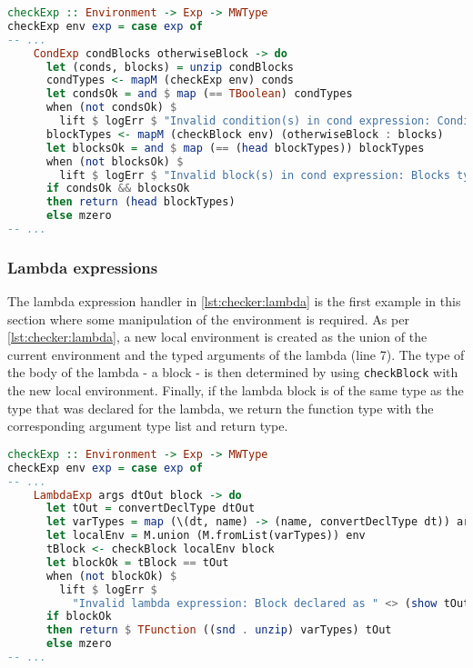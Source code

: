 \begin{lstlisting}[language=haskell,
caption={Handler for \lstinline{cond} expressions},
label=lst:checker:cond]
checkExp :: Environment -> Exp -> MWType
checkExp env exp = case exp of
-- ...
    CondExp condBlocks otherwiseBlock -> do
      let (conds, blocks) = unzip condBlocks
      condTypes <- mapM (checkExp env) conds
      let condsOk = and $ map (== TBoolean) condTypes
      when (not condsOk) $
        lift $ logErr $ "Invalid condition(s) in cond expression: Condition types were " <> (show condTypes)
      blockTypes <- mapM (checkBlock env) (otherwiseBlock : blocks)
      let blocksOk = and $ map (== (head blockTypes)) blockTypes
      when (not blocksOk) $
        lift $ logErr $ "Invalid block(s) in cond expression: Blocks types were " <> (show condTypes)
      if condsOk && blocksOk
      then return (head blockTypes)
      else mzero
-- ...
\end{lstlisting}

\subsubsection{Lambda expressions}
The lambda expression handler in \cref{lst:checker:lambda} is the first example in this section where some manipulation of the environment is required. As per \cref{lst:checker:lambda}, a new local environment is created as the union of the current environment and the typed arguments of the lambda (line 7). The type of the body of the lambda - a block - is then determined by using \lstinline{checkBlock} with the new local environment. Finally, if the lambda block is of the same type as the type that was declared for the lambda, we return the function type with the corresponding argument type list and return type.

\begin{lstlisting}[language=haskell,
caption={Handler for lambda expressions},
label=lst:checker:lambda]
checkExp :: Environment -> Exp -> MWType
checkExp env exp = case exp of
-- ...
    LambdaExp args dtOut block -> do
      let tOut = convertDeclType dtOut
      let varTypes = map (\(dt, name) -> (name, convertDeclType dt)) args
      let localEnv = M.union (M.fromList(varTypes)) env
      tBlock <- checkBlock localEnv block
      let blockOk = tBlock == tOut
      when (not blockOk) $
        lift $ logErr $
          "Invalid lambda expression: Block declared as " <> (show tOut) <> " but was " <> (show tBlock)
      if blockOk
      then return $ TFunction ((snd . unzip) varTypes) tOut
      else mzero
-- ...
\end{lstlisting}

